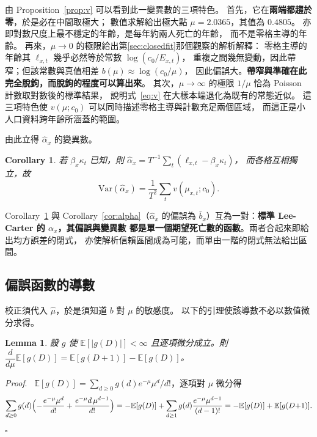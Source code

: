 \documentclass[UTF8, fontset=macnew, a4paper, 12pt]{ctexart}
\newtheorem{cor}{Corollary}
\newtheorem{lem}{Lemma}
\newenvironment{proof}{\par\noindent\textit{Proof}.\ }{\hfill$\square$\par\vspace{4pt}}
\newcommand{\Ex}{\mathbb{E}}
\begin{document}
由 Proposition~\ref{prop:v} 可以看到此一變異數的三項特色。
首先，它在\textbf{兩端都趨於零}，於是必在中間取極大；
數值求解給出極大點 $\mu=2.0365$，其值為 $0.4805$。
亦即對數尺度上最不穩定的年齡，是每年約兩人死亡的年齡，
而不是零格主導的年齡。
再來，$\mu\to0$ 的極限給出第\ref{sec:closedfit}那個觀察的解析解釋：
零格主導的年齡其 $\ell_{x,t}$ 幾乎必然等於常數 $\log(c_0/E_{x,t})$，
重複之間幾無變動，因此帶窄；但該常數與真值相差 $b(\mu)\approx\log(c_0/\mu)$，
因此偏誤大。\textbf{帶窄與準確在此完全脫鉤，而脫鉤的程度可以算出來}。
其次，$\mu\to\infty$ 的極限 $1/\mu$ 恰為 Poisson 計數取對數後的標準結果，
說明式~\eqref{eq:v} 在大樣本端退化為既有的常態近似。
這三項特色使 $v(\mu;c_0)$ 可以同時描述零格主導與計數充足兩個區域，
而這正是小人口資料跨年齡所涵蓋的範圍。

由此立得 $\hat\alpha_x$ 的變異數。

\begin{cor}\label{cor:var}
若 $\beta_x\kappa_t$ 已知，則 $\hat\alpha_x=T^{-1}\sum_t(\ell_{x,t}-\beta_x\kappa_t)$，
而各格互相獨立，故
\begin{equation}\label{eq:valpha}
\mathrm{Var}(\hat\alpha_x)=\frac{1}{T^{2}}\sum_{t}v(\mu_{x,t};c_0).
\end{equation}
\end{cor}

Corollary~\ref{cor:var} 與 Corollary~\ref{cor:alpha}（$\hat\alpha_x$ 的偏誤為
$\bar b_x$）互為一對：\textbf{標準 Lee-Carter 的 $\alpha_x$，其偏誤與變異數
都是單一個期望死亡數的函數}。兩者合起來即給出均方誤差的閉式，
亦使解析信賴區間成為可能，而單由一階的閉式無法給出區間。

\subsection{偏誤函數的導數}\label{subsec:bderiv}

校正須代入 $\hat\mu$，於是須知道 $b$ 對 $\mu$ 的敏感度。
以下的引理使該導數不必以數值微分求得。

\begin{lem}\label{lem:diff}
設 $g$ 使 $\Ex[|g(D)|]<\infty$ 且逐項微分成立。則
$\dfrac{d}{d\mu}\Ex[g(D)]=\Ex[g(D{+}1)]-\Ex[g(D)]$。
\end{lem}

\begin{proof}
$\Ex[g(D)]=\sum_{d\ge0}g(d)e^{-\mu}\mu^{d}/d!$，逐項對 $\mu$ 微分得
\[
\sum_{d\ge0}g(d)\Bigl(-\frac{e^{-\mu}\mu^{d}}{d!}
+\frac{e^{-\mu}d\,\mu^{d-1}}{d!}\Bigr)
=-\Ex[g(D)]+\sum_{d\ge1}g(d)\frac{e^{-\mu}\mu^{d-1}}{(d-1)!}
=-\Ex[g(D)]+\Ex[g(D{+}1)].
\]
\end{proof}
\end{document}

